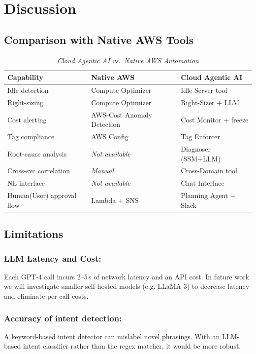 \documentclass{ieeeaccess}
\begin{document}
\section{Discussion}
\label{sec:discussion}

\subsection{Comparison with Native AWS Tools}

\begin{table}[ht]
\caption{\textit{Cloud Agentic AI vs.\ Native AWS Automation}}
\centering
\setlength{\tabcolsep}{3pt}
\begin{tabular}{p{2.3cm}p{2.4cm}p{2.2cm}}
\toprule
\textbf{Capability} & \textbf{Native AWS} & \textbf{Cloud Agentic AI} \\
\midrule
Idle detection       & Compute Optimizer       & Idle Server tool \\
Right-sizing         & Compute Optimizer       & Right-Sizer + LLM \\
Cost alerting        & AWS-Cost Anomaly Detection  & Cost Monitor + freeze \\
Tag compliance       & AWS Config              & Tag Enforcer \\
Root-cause analysis  & \textit{Not available}  & Diagnoser (SSM+LLM) \\
Cross-svc correlation& \textit{Manual}          & Cross-Domain tool \\
NL interface         & \textit{Not available}  & Chat Interface \\
Human(User) approval flow  & Lambda + SNS            & Planning Agent + Slack \\
\bottomrule
\end{tabular}
\label{tab:comparison}
\end{table}

\subsection{Limitations}

\subsubsection{LLM Latency and Cost:} Each GPT-4 call incurs 2--5\,s of network
latency and an API cost. In future work we will investigate smaller self-hosted models (e.g. LLaMA 3) to decrease latency and eliminate per-call costs.

\subsubsection{Accuracy of intent detection:} A keyword-based intent detector can mislabel novel phrasings. With an LLM-based intent classifier rather than the regex matcher, it would be more robust.
\end{document}
